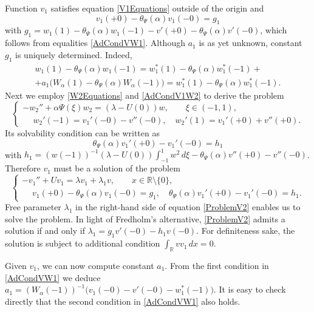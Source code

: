 \documentclass[11pt,english]{amsart}
\begin{document}
Function $v_1$ satisfies  equation \eqref{V1Equations} outside of the origin and
\begin{equation*}
    v_1(+0)-\theta_\Psi(\alpha)v_1(-0)=g_1
\end{equation*}
with $g_1=w_1(1)-\theta_\Psi(\alpha)w_1(-1)-v '(+0)-\theta_\Psi(\alpha)v '(-0)$, which follows from equalities \eqref{AdCondVW1}.
Although $a_1$ is as yet unknown, constant $g_1$ is uniquely determined. Indeed,
\begin{multline*}
    w_1(1)-\theta_\Psi(\alpha)w_1(-1)=w_1^*(1)-\theta_\Psi(\alpha)w_1^*(-1)+\\
    +a_1\bigl(W_\alpha(1)-\theta_\Psi(\alpha)W_\alpha(-1)\bigr)=w_1^*(1)-\theta_\Psi(\alpha)w_1^*(-1).
\end{multline*}
Next we employ \eqref{W2Equations} and \eqref{AdCondV1W2} to derive the problem
\begin{equation}\label{W2Problem}
\begin{cases}
-w_2''+\alpha\Psi(\xi)w_2=(\lambda-U(0))w ,\qquad \xi\in(-1,1),\\
\phantom{-}w_2'(-1)=v_1'(-0)-v ''(-0),\quad w_2'(1)=v_1'(+0)+v ''(+0).
\end{cases}
\end{equation}
Its solvability condition can be written as
\begin{equation}\label{SolvabilityW2}
    \theta_\Psi(\alpha)v_1'(+0)-v_1'(-0)=h_1
\end{equation}
with $h_1=(w(-1))^{-1}(\lambda -U(0))\int_{-1}^1w^2\,d\xi -\theta_\Psi(\alpha)v ''(+0)-v ''(-0)$.
Therefore  $v_1$ must be a solution of the problem
\begin{equation}\label{ProblemV2}
\begin{cases}
    -v_1''+Uv_1=\lambda v_1+\lambda_1v,\qquad x\in\mathbb R\setminus\{0\},\\
    \phantom{-}v_1(+0)-\theta_\Psi(\alpha)v_1(-0)=g_1,\quad \theta_\Psi(\alpha)v_1'(+0)-v_1'(-0)=h_1.
\end{cases}
\end{equation}
Free parameter $\lambda_1$ in the right-hand side of equation \eqref{ProblemV2} enables us to solve the problem.
In light of Fredholm's alternative, \eqref{ProblemV2} admits a solution if and only if
$\lambda_1=g_1v '(-0)-h_1v (-0)$. For definiteness sake, the solution is subject to additional condition
$\int_{\mathbb{R}}v v_1\,dx=0$.

Given $v_1$, we can now compute constant $a_1$. From the first condition in \eqref{AdCondVW1} we deduce  $a_1=(W_\alpha(-1))^{-1}\bigl(v_1(-0)-v'(-0)-w_1^*(-1)\bigr)$. It is easy to check directly that the second condition in \eqref{AdCondVW1} also holds.
\end{document}
